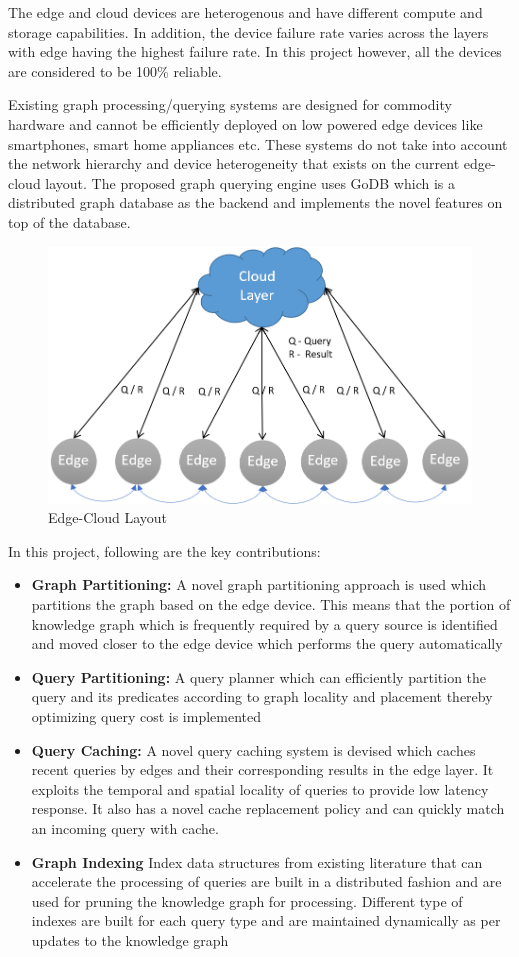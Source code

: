 \documentclass[conference]{IEEEtran}
\begin{document}
The edge and cloud devices are heterogenous and have different compute and storage capabilities. In addition, the device failure rate varies across the layers with edge having the highest failure rate. In this project however, all the devices are considered to be 100\% reliable.

Existing graph processing/querying systems are designed for commodity hardware and cannot be efficiently deployed on low powered edge devices like smartphones, smart home appliances etc. These systems do not take into account the network hierarchy and device heterogeneity that exists on the current edge-cloud layout. The proposed graph querying engine uses GoDB which is a distributed graph database as the backend and implements the novel features on top of the database.

\begin{figure}[!t]
	\centering
	\includegraphics[width=0.83\columnwidth]{4.png}
	\caption{Edge-Cloud Layout}
	\label{fig:1}
\end{figure}
In this project, following are the key contributions:
\begin{itemize}%
	\item \textbf{Graph Partitioning:} A novel graph partitioning approach is used which partitions the graph based on the edge device. This means that the portion of knowledge graph which is frequently required by a query source is identified and moved closer to the edge device which performs the query automatically 
	\item \textbf{Query Partitioning:} A query planner which can efficiently partition the query and its predicates according to graph locality and placement thereby optimizing query cost is implemented
	\item \textbf{Query Caching:} A novel query caching system is devised which caches recent queries by edges and their corresponding results in the edge layer. It exploits the temporal and spatial locality of queries to provide low latency response. It also has a novel cache replacement policy and can quickly match an incoming query with cache. 
	\item \textbf{Graph Indexing} Index data structures from existing literature that can accelerate the processing of queries are built in a distributed fashion and are used for pruning the knowledge graph for processing. Different type of indexes are built for each query type and are maintained dynamically as per updates to the knowledge graph    
\end{itemize}
\end{document}
